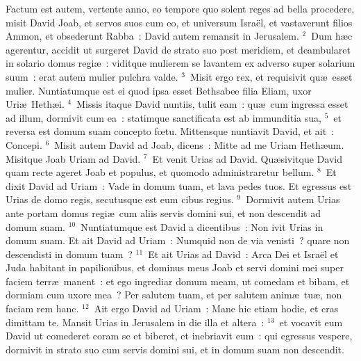 \lettrine[lines=3,image=true,loversize=0.05,lraise=-0.03]{F}{}actum est autem, vertente anno, eo tempore quo solent reges ad bella procedere, misit David Joab, et servos suos cum eo, et universum Isra\"el, et vastaverunt filios Ammon, et obsederunt Rabba~: David autem remansit in Jerusalem.
${}^{2}$~Dum h\ae c agerentur, accidit ut surgeret David de strato suo post meridiem, et deambularet in solario domus regi\ae~: viditque mulierem se lavantem ex adverso super solarium suum~: erat autem mulier pulchra valde.
${}^{3}$~Misit ergo rex, et requisivit qu\ae\ esset mulier. Nuntiatumque est ei quod ipsa esset Bethsabee filia Eliam, uxor Uri\ae\ Heth\ae i.
${}^{4}$~Missis itaque David nuntiis, tulit eam~: qu\ae\ cum ingressa esset ad illum, dormivit cum ea~: statimque sanctificata est ab immunditia sua,
${}^{5}$~et reversa est domum suam concepto fœtu. Mittensque nuntiavit David, et ait~: Concepi.
${}^{6}$~Misit autem David ad Joab, dicens~: Mitte ad me Uriam Heth\ae um. Misitque Joab Uriam ad David.
${}^{7}$~Et venit Urias ad David. Qu\ae sivitque David quam recte ageret Joab et populus, et quomodo administraretur bellum.
${}^{8}$~Et dixit David ad Uriam~: Vade in domum tuam, et lava pedes tuos. Et egressus est Urias de domo regis, secutusque est eum cibus regius.
${}^{9}$~Dormivit autem Urias ante portam domus regi\ae\ cum aliis servis domini sui, et non descendit ad domum suam.
${}^{10}$~Nuntiatumque est David a dicentibus~: Non ivit Urias in domum suam. Et ait David ad Uriam~: Numquid non de via venisti~? quare non descendisti in domum tuam~?
${}^{11}$~Et ait Urias ad David~: Arca Dei et Isra\"el et Juda habitant in papilionibus, et dominus meus Joab et servi domini mei super faciem terr\ae\ manent~: et ego ingrediar domum meam, ut comedam et bibam, et dormiam cum uxore mea~? Per salutem tuam, et per salutem anim\ae\ tu\ae , non faciam rem hanc.
${}^{12}$~Ait ergo David ad Uriam~: Mane hic etiam hodie, et cras dimittam te. Mansit Urias in Jerusalem in die illa et altera~:
${}^{13}$~et vocavit eum David ut comederet coram se et biberet, et inebriavit eum~: qui egressus vespere, dormivit in strato suo cum servis domini sui, et in domum suam non descendit.


